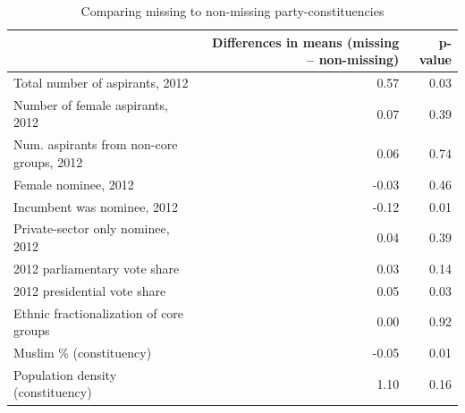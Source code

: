 \begin{table}[ht]
\centering
\caption{Comparing missing to non-missing party-constituencies} 
\label{tab:missing}
\begin{tabular}{lrr}
  \hline
 & Differences in means (missing -- non-missing) & p-value \\ 
  \hline
Total number of aspirants, 2012 & 0.57 & 0.03 \\ 
  Number of female aspirants, 2012 & 0.07 & 0.39 \\ 
  Num. aspirants from non-core groups, 2012 & 0.06 & 0.74 \\ 
  Female nominee, 2012 & -0.03 & 0.46 \\ 
  Incumbent was nominee, 2012 & -0.12 & 0.01 \\ 
  Private-sector only nominee, 2012 & 0.04 & 0.39 \\ 
  2012 parliamentary vote share & 0.03 & 0.14 \\ 
  2012 presidential vote share & 0.05 & 0.03 \\ 
  Ethnic fractionalization of core groups & 0.00 & 0.92 \\ 
  Muslim \% (constituency) & -0.05 & 0.01 \\ 
  Population density (constituency) & 1.10 & 0.16 \\ 
   \hline
\end{tabular}
\end{table}
